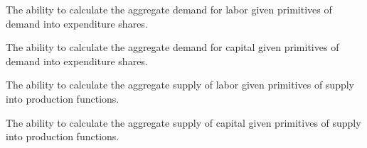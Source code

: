 \begin{el}
    {The ability to calculate the aggregate demand for labor given primitives of demand into expenditure shares.}
\end{el}

\begin{el}
    {The ability to calculate the aggregate demand for capital given primitives of demand into expenditure shares.}
\end{el}

\begin{el}
    {The ability to calculate the aggregate supply of labor given primitives of supply into production functions.}
\end{el}


\begin{el}
    {The ability to calculate the aggregate supply of capital given primitives of supply into production functions.}
\end{el}






